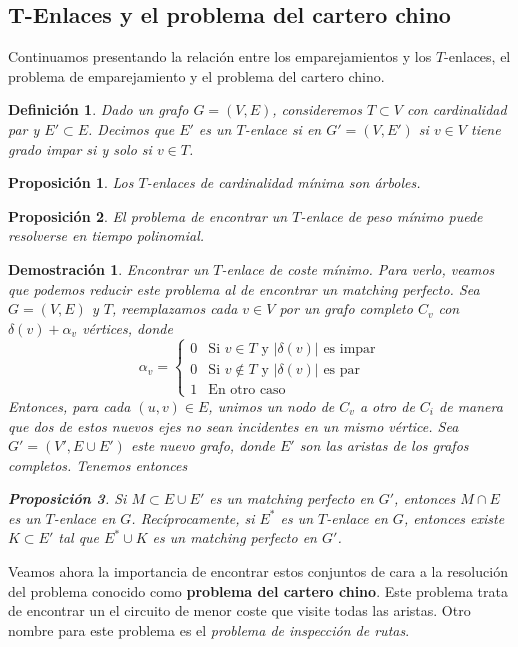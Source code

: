 \documentclass[twoside,a4paper,openright,12pt]{book}
\newtheorem{defi}{Definici\'on}[section]
\newtheorem{prop}{Proposici\'on}[section]
\newtheorem*{dem}{Demostración}
\begin{document}
\subsection{T-Enlaces y el problema del cartero chino}
Continuamos presentando la relación entre los emparejamientos y los $T$-enlaces, el problema de emparejamiento y el problema del cartero chino.
\begin{defi}
Dado un grafo $G=(V,E)$, consideremos $T\subset V$ con cardinalidad par y $E'\subset E$. Decimos que $E'$ es un $T$-enlace si en $G'=(V,E')$ si $v\in V$ tiene grado impar si y solo si $v\in T$.
\end{defi}
\begin{prop}
Los $T$-enlaces de cardinalidad mínima son árboles.
\end{prop}
\begin{prop}
El problema de encontrar un $T$-enlace de peso mínimo puede resolverse en tiempo polinomial.
\end{prop}
\begin{dem}
Encontrar un $T$-enlace de coste mínimo. Para verlo, veamos que podemos reducir este problema al de encontrar un matching perfecto. Sea $G=(V,E)$ y $T$, reemplazamos cada $v\in V$ por un grafo completo $C_v$ con $\delta(v)+\alpha_v$ vértices, donde
$$
\alpha_v = \begin{cases}
0 & \text{Si $v\in T$ y $|\delta(v)|$ es impar}\\
0 & \text{Si $v\notin T$ y $|\delta(v)|$ es par}\\
1 & \text{En otro caso}
\end{cases}
$$
Entonces, para cada $(u,v)\in E$, unimos un nodo de $C_v$ a otro de $C_i$ de manera que dos de estos nuevos ejes no sean incidentes en un mismo vértice. Sea $G'=(V',E\cup E')$ este nuevo grafo, donde $E'$ son las aristas de los grafos completos. Tenemos entonces
\begin{prop}
Si $M\subset E\cup E'$ es un matching perfecto en $G'$, entonces $M\cap E$ es un $T$-enlace en $G$. Recíprocamente, si $E^*$ es un $T$-enlace en $G$, entonces existe $K\subset E'$ tal que $E^*\cup K$ es un matching perfecto en $G'$.
\end{prop}
\end{dem}
Veamos ahora la importancia de encontrar estos conjuntos de cara a la resolución del problema conocido como \textbf{problema del cartero chino}. Este problema trata de encontrar un el circuito de menor coste que visite todas las aristas. Otro nombre para este problema es el \textit{problema de inspección de rutas}. 
\end{document}
